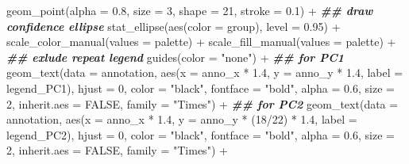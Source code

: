 \documentclass[
]{article}
\newenvironment{Shaded}{\begin{snugshade}}{\end{snugshade}}
\newcommand{\AttributeTok}[1]{\textcolor[rgb]{0.77,0.63,0.00}{#1}}
\newcommand{\ConstantTok}[1]{\textcolor[rgb]{0.00,0.00,0.00}{#1}}
\newcommand{\DecValTok}[1]{\textcolor[rgb]{0.00,0.00,0.81}{#1}}
\newcommand{\DocumentationTok}[1]{\textcolor[rgb]{0.56,0.35,0.01}{\textbf{\textit{#1}}}}
\newcommand{\FloatTok}[1]{\textcolor[rgb]{0.00,0.00,0.81}{#1}}
\newcommand{\FunctionTok}[1]{\textcolor[rgb]{0.00,0.00,0.00}{#1}}
\newcommand{\NormalTok}[1]{#1}
\newcommand{\SpecialCharTok}[1]{\textcolor[rgb]{0.00,0.00,0.00}{#1}}
\newcommand{\StringTok}[1]{\textcolor[rgb]{0.31,0.60,0.02}{#1}}
\begin{document}
\begin{Shaded}
\begin{Highlighting}[]
      \FunctionTok{geom\_point}\NormalTok{(}\AttributeTok{alpha =} \FloatTok{0.8}\NormalTok{, }\AttributeTok{size =} \DecValTok{3}\NormalTok{, }\AttributeTok{shape =} \DecValTok{21}\NormalTok{, }\AttributeTok{stroke =} \FloatTok{0.1}\NormalTok{) }\SpecialCharTok{+}
      \DocumentationTok{\#\# draw confidence ellipse}
      \FunctionTok{stat\_ellipse}\NormalTok{(}\FunctionTok{aes}\NormalTok{(}\AttributeTok{color =}\NormalTok{ group), }\AttributeTok{level =} \FloatTok{0.95}\NormalTok{) }\SpecialCharTok{+}
      \FunctionTok{scale\_color\_manual}\NormalTok{(}\AttributeTok{values =}\NormalTok{ palette) }\SpecialCharTok{+}
      \FunctionTok{scale\_fill\_manual}\NormalTok{(}\AttributeTok{values =}\NormalTok{ palette) }\SpecialCharTok{+}
      \DocumentationTok{\#\# exlude repeat legend}
      \FunctionTok{guides}\NormalTok{(}\AttributeTok{color =}  \StringTok{"none"}\NormalTok{) }\SpecialCharTok{+}
      \DocumentationTok{\#\# for PC1}
      \FunctionTok{geom\_text}\NormalTok{(}\AttributeTok{data =}\NormalTok{ annotation, }\FunctionTok{aes}\NormalTok{(}\AttributeTok{x =}\NormalTok{ anno\_x }\SpecialCharTok{*} \FloatTok{1.4}\NormalTok{, }\AttributeTok{y =}\NormalTok{ anno\_y }\SpecialCharTok{*} \FloatTok{1.4}\NormalTok{, }\AttributeTok{label =}\NormalTok{ legend\_PC1),}
                \AttributeTok{hjust =} \DecValTok{0}\NormalTok{, }\AttributeTok{color =} \StringTok{"black"}\NormalTok{,}
                \AttributeTok{fontface =} \StringTok{"bold"}\NormalTok{, }\AttributeTok{alpha =} \FloatTok{0.6}\NormalTok{,}
                \AttributeTok{size =} \DecValTok{2}\NormalTok{, }\AttributeTok{inherit.aes =} \ConstantTok{FALSE}\NormalTok{,}
                \AttributeTok{family =} \StringTok{"Times"}\NormalTok{) }\SpecialCharTok{+}
      \DocumentationTok{\#\# for PC2}
      \FunctionTok{geom\_text}\NormalTok{(}\AttributeTok{data =}\NormalTok{ annotation, }\FunctionTok{aes}\NormalTok{(}\AttributeTok{x =}\NormalTok{ anno\_x }\SpecialCharTok{*} \FloatTok{1.4}\NormalTok{, }\AttributeTok{y =}\NormalTok{ anno\_y }\SpecialCharTok{*}\NormalTok{ (}\DecValTok{18}\SpecialCharTok{/}\DecValTok{22}\NormalTok{) }\SpecialCharTok{*} \FloatTok{1.4}\NormalTok{, }\AttributeTok{label =}\NormalTok{ legend\_PC2),}
                \AttributeTok{hjust =} \DecValTok{0}\NormalTok{, }\AttributeTok{color =} \StringTok{"black"}\NormalTok{, }\AttributeTok{fontface =} \StringTok{"bold"}\NormalTok{,}
                \AttributeTok{alpha =} \FloatTok{0.6}\NormalTok{, }\AttributeTok{size =} \DecValTok{2}\NormalTok{, }\AttributeTok{inherit.aes =} \ConstantTok{FALSE}\NormalTok{,}
                \AttributeTok{family =} \StringTok{"Times"}\NormalTok{) }\SpecialCharTok{+}

\end{Highlighting}
\end{Shaded}
\end{document}
